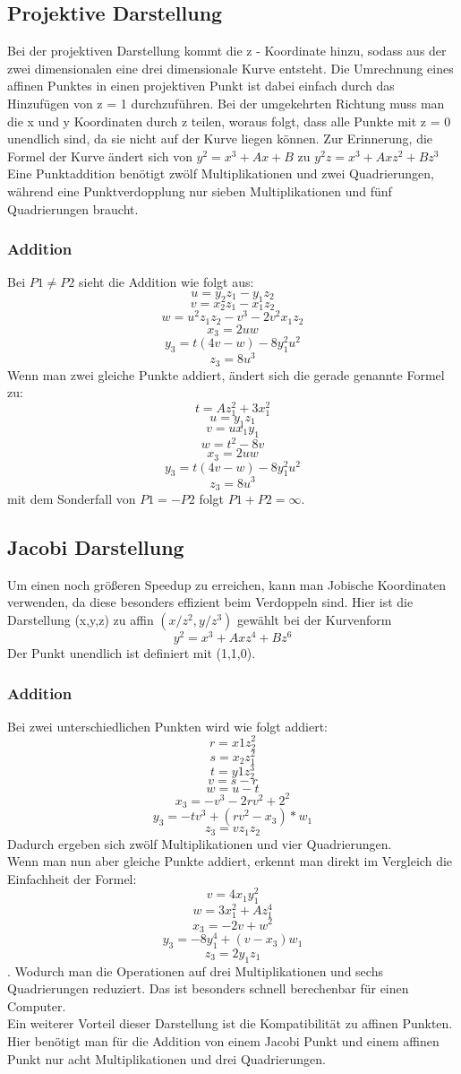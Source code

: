 \subsection{Projektive Darstellung}
Bei der projektiven Darstellung kommt die z - Koordinate hinzu, sodass aus der zwei dimensionalen eine drei dimensionale Kurve entsteht. Die Umrechnung eines affinen Punktes in einen projektiven Punkt ist dabei einfach durch das Hinzufügen von z = 1 durchzuführen. Bei der umgekehrten Richtung muss man die x und y Koordinaten durch z teilen, woraus folgt, dass alle Punkte mit z = 0 unendlich sind, da sie nicht auf der Kurve liegen können. Zur Erinnerung, die Formel der Kurve ändert sich von \(y^2 = x^3 + Ax + B\) zu \(y^2z = x^3 + Axz^2 + Bz^3\)\\
Eine Punktaddition benötigt zwölf Multiplikationen und zwei Quadrierungen, während eine Punktverdopplung nur sieben Multiplikationen und fünf Quadrierungen braucht.
\\
\subsubsection{Addition}
Bei \(P1 \neq P2\) sieht die Addition wie folgt aus:
\[u = y_2z_1 - y_1z_2\] \[v = x_2z_1 - x_1z_2\] \[w = u^2z_1z_2 - v^3 -2v^2x_1z_2\] \[x_3 = 2uw\] \[y_3 = t(4v -w)-8y_1^2u^2\] \[z_3 = 8u^3\]
Wenn man zwei gleiche Punkte addiert, ändert sich die gerade genannte Formel zu:
\[t = Az_1^2 + 3x_1^2\] \[u = y_1z_1\] \[v = ux_1y_1\] \[w = t^2 - 8v\] \[x_3 = 2uw\] \[y_3 = t(4v-w)- 8y_1^2u^2\] \[z_3 = 8u^3\] mit dem Sonderfall von \(P1 = -P2\) folgt \(P1 + P2 = \infty\).
\subsection{Jacobi Darstellung}
Um einen noch größeren Speedup zu erreichen, kann man Jobische Koordinaten verwenden, da diese besonders effizient beim Verdoppeln sind. Hier ist die Darstellung (x,y,z) zu affin \((x/z^2, y/z^3)\) gewählt bei der Kurvenform \[y^2 = x^3 + Axz^4 + Bz^6\]Der Punkt unendlich ist definiert mit (1,1,0). 
\subsubsection{Addition}
Bei zwei unterschiedlichen Punkten wird wie folgt addiert:
\[r = x1z_2^2\] \[s = x_2z_1^2\] \[t = y1z_2^3\] \[v = s - r\] \[w = u - t\] \[x_3 = -v^3 - 2rv^2 + 2^2\] \[y_3 = -tv^3 + (rv^2-x_3)*w_1\] \[z_3 = vz_1z_2\]
Dadurch ergeben sich zwölf Multiplikationen und vier Quadrierungen.\\
Wenn man nun aber gleiche Punkte addiert, erkennt man direkt im Vergleich die Einfachheit der Formel:
\[v = 4x_1y_1^2\] \[w = 3x_1^2 + Az_1^4\] \[x_3 = -2v + w^2\] \[y_3 = -8y_1^4 + (v-x_3)w_1\] \[z_3 = 2y_1z_1\]. Wodurch man die Operationen auf drei Multiplikationen und sechs Quadrierungen reduziert. Das ist besonders schnell berechenbar für einen Computer.\\
Ein weiterer Vorteil dieser Darstellung ist die Kompatibilität zu affinen Punkten. Hier benötigt man für die Addition von einem Jacobi Punkt und einem affinen Punkt nur acht Multiplikationen und drei Quadrierungen.

